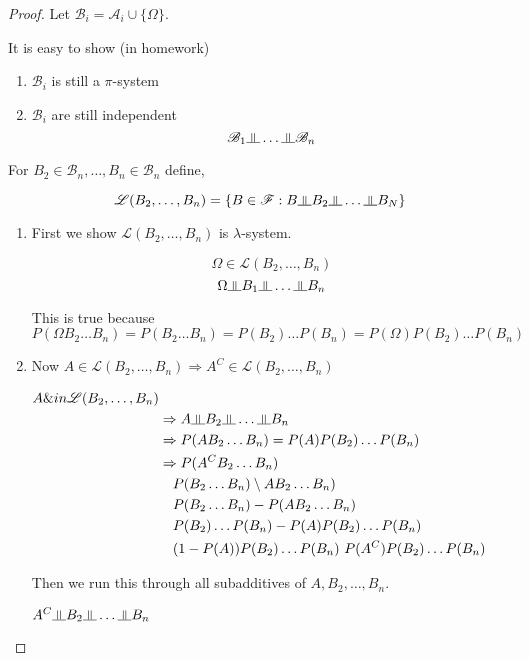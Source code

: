 \documentclass[11pt,fleqn]{book} %
\newcommand{\indep}{\rotatebox[origin=c]{90}{$\models$}}
\begin{document}
\begin{proof}
	Let $\mathscr{B}_i = \mathscr{A}_i \cup \{\Omega\}$. 

	It is easy to show (in homework)

	\begin{enumerate}
		\item $\mathscr{B}_i$ is still a $\pi$-system
		\item $\mathscr{B}_i$ are still independent
		$$\mathscr{B}_1 \indep \dots \indep \mathscr{B}_n $$
	\end{enumerate}

	For $B_2 \in \mathscr{B}_n, \dots, B_n \in \mathscr{B}_n$ define, 

	$$\mathscr{L}(B_2, \dots, B_n) = \{B \in \mathscr{F}: B \indep B_2 \indep \dots \indep B_N \}$$


	\begin{enumerate}
		\item First we show $\mathscr{L}(B_2, \dots, B_n)$ is $\lambda$-system. 

	$$\Omega \in \mathscr{L}(B_2, \dots, B_n) $$
	$$\Omega \indep B_1 \indep \dots \indep B_n $$

	This is true because $P(\Omega B_2 \dots B_n) = P(B_2 \dots B_n) = P(B_2)\dots P(B_n) = P(\Omega)P(B_2)\dots P(B_n)$
		\item Now $A \in \mathscr{L}(B_2, \dots, B_n) \Rightarrow A^C \in \mathscr{L}(B_2, \dots, B_n)$

		$\begin{aligned}
				A \&in \mathscr{L}(B_2, \dots, B_n)\\
				&\Rightarrow A \indep B_2 \indep \dots \indep B_n	\\
				&\Rightarrow P(A B_2 \dots B_n) = P(A)P(B_2)\dots P(B_n)\\
				&\Rightarrow P(A^C B_2 \dots B_n)\\
				&\quad P(B_2 \dots B_n) \setminus A B_2 \dots B_n)\\
				&\quad P(B_2 \dots B_n) - P(A B_2 \dots B_n)\\
				&\quad P(B_2)\dots P(B_n) - P(A)P(B_2)\dots P(B_n)\\
				&\quad (1-P(A))P(B_2) \dots P(B_n) \ P(A^C)P(B_2)\dots P(B_n)\\
		\end{aligned}$

		Then we run this through all subadditives of $A, B_2, \dots, B_n$. 

		$A^C \indep B_2 \indep \dots \indep B_n$


\end{enumerate}
\end{proof}
\end{document}
